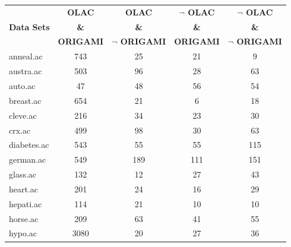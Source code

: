 \begin{table}[htbp]
	\centering
		\begin{tabular}{|l|c|c|c|c|}
		\hline
				& \textbf{OLAC}		& \textbf{OLAC}			& \textbf{$\neg$ OLAC}	& \textbf{$\neg$ OLAC}	\\
		\textbf{Data Sets}	& \textbf{\&}		& \textbf{\&}			& \textbf{\&}			& \textbf{\&}			\\
				& \textbf{ORIGAMI}	& \textbf{$\neg$ ORIGAMI}	& \textbf{ORIGAMI}		& \textbf{$\neg$ ORIGAMI}	\\
		\hline
		anneal.ac       & 743           & 25                 & 21                       & 9                             \\
		\hline
		austra.ac       & 503           & 96                 & 28                       & 63                            \\
		\hline
		auto.ac         & 47            & 48                 & 56                       & 54                            \\
		\hline
		breast.ac       & 654           & 21                 & 6                        & 18                            \\
		\hline
		cleve.ac        & 216           & 34                 & 23                       & 30                            \\
		\hline
		crx.ac          & 499           & 98                 & 30                       & 63                            \\
		\hline
		diabetes.ac     & 543           & 55                 & 55                       & 115                           \\
		\hline
		german.ac       & 549           & 189                & 111                      & 151                           \\
		\hline
		glass.ac        & 132           & 12                 & 27                       & 43                            \\
		\hline
		heart.ac        & 201           & 24                 & 16                       & 29                            \\
		\hline
		hepati.ac       & 114           & 21                 & 10                       & 10                            \\
		\hline
		horse.ac        & 209           & 63                 & 41                       & 55                            \\
		\hline
		hypo.ac         & 3080          & 20                 & 27                       & 36                            \\

\end{tabular}
\end{table}

